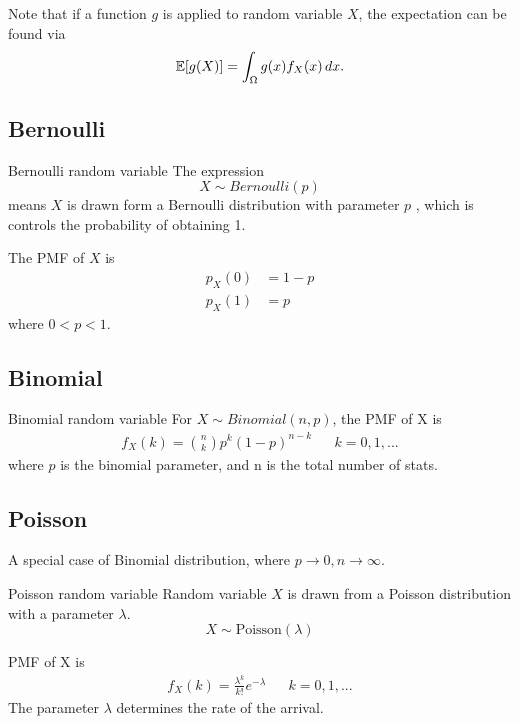 Note that if a function $g$ is applied to random variable $X$, the expectation can be found via
\begin{equation*}
  \mathbb{E}[g(X)]=\int_{\Omega}g(x)f_X(x)\,dx.
\end{equation*}

\subsection{Bernoulli}

\begin{fact}{Bernoulli random variable}{}
    The expression
    \begin{equation*}
        X \sim Bernoulli(p)
    \end{equation*}
    means $X$ is drawn form a Bernoulli distribution with parameter $p$
    , which is controls the probability of obtaining 1.
    
    The PMF of $X$ is
    \begin{align*}
        p_X(0) &= 1-p\\
        p_X(1) &= p
    \end{align*}
    where $0<p<1$.
\end{fact}

\subsection{Binomial}

\begin{fact}{Binomial random variable}{}
  For $X \sim Binomial(n,p)$, the PMF of X is
  \begin{align*}
    f_X(k) = \binom{n}{k}p^k(1-p)^{n-k} &&k=0,1,...
  \end{align*}
  where $p$ is the binomial parameter, and n is the total number of stats.
\end{fact}

\subsection{Poisson}
A special case of Binomial distribution, where $p\rightarrow0,n\rightarrow\infty$.

\begin{fact}{Poisson random variable}{}
  Random variable $X$ is drawn from a Poisson distribution with a parameter $\lambda$.
  \begin{equation*}
      X \sim \text{Poisson}(\lambda)
  \end{equation*}

  PMF of X is
  \begin{align*}
    f_X(k) =  \frac{\lambda^k}{k!}e^{-\lambda} && k = 0,1,...
  \end{align*}
  The parameter $\lambda$ determines the rate of the arrival.
\end{fact}

